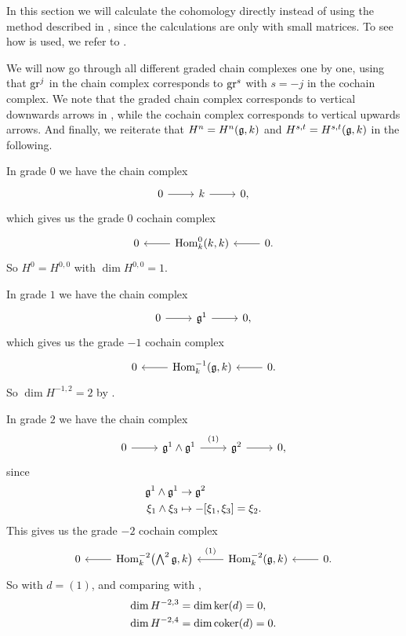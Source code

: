 \begin{remark}
  In this section we will calculate the cohomology directly instead of using the method described in , since the calculations are only with small matrices. To see how  is used, we refer to .
\end{remark}

We will now go through all different graded chain complexes one by one, using that $\operatorname{gr}^{j}$ in the chain complex corresponds to $\operatorname{gr}^{s}$ with $s = -j$ in the cochain complex. We note that the graded chain complex corresponds to vertical downwards arrows in , while the cochain complex corresponds to vertical upwards arrows. And finally, we reiterate that $H^{n} = H^{n}(\mathfrak{g},k)$ and $H^{s,t} = H^{s,t}(\mathfrak{g},k)$ in the following.

In grade $0$ we have the chain complex
\[
  \begin{tikzcd}
    0 \ar[r] & k \ar[r] & 0,
  \end{tikzcd}
\]
which gives us the grade $0$ cochain complex
\[
  \begin{tikzcd}
    0 & \ar[l] \Hom_{k}^{0}(k,k) & \ar[l] 0.
  \end{tikzcd}
\]
So $H^{0} = H^{0,0}$ with $\dim H^{0,0} = 1$.

In grade $1$ we have the chain complex
\[
  \begin{tikzcd}
    0 \ar[r] & \lie{g}^{1} \ar[r] & 0,
  \end{tikzcd}
\]
which gives us the grade $-1$ cochain complex
\[
  \begin{tikzcd}
    0 & \ar[l] \Hom_{k}^{-1}(\lie{g},k) & \ar[l] 0.
  \end{tikzcd}
\]
So $\dim H^{-1,2} = 2$ by .

In grade $2$ we have the chain complex
\[
  \begin{tikzcd}[ampersand replacement=\&]
    0 \ar[r] \& \lie{g}^{1} \wedge \lie{g}^{1} \ar[r, "{(1)}" {yshift=2pt}] \& \lie{g}^{2} \ar[r] \& 0,
  \end{tikzcd}
\]
since
\begin{align*}
  \mathfrak{g}^{1} \wedge \mathfrak{g}^{1} &\to \mathfrak{g}^{2} \\
  \xi_{1} \wedge \xi_{3} &\mapsto -[\xi_{1},\xi_{3}] = \xi_{2}.
\end{align*}
This gives us the grade $-2$ cochain complex
\[
  \begin{tikzcd}[ampersand replacement=\&]
    0 \& \ar[l] \Hom_{k}^{-2}\bigl( \bigwedge^{2} \lie{g}, k \bigr) \& \ar[l, "{(1)}"' {yshift=2pt}] \Hom_{k}^{-2}(\lie{g},k) \& \ar[l] 0.
  \end{tikzcd}
\]
So with $d = (1)$, and comparing with ,
\begin{align*}
  \dim H^{-2,3} &= \dim \operatorname{ker}(d) = 0, \\
  \dim H^{-2,4} &= \dim \operatorname{coker}(d) = 0.
\end{align*}


